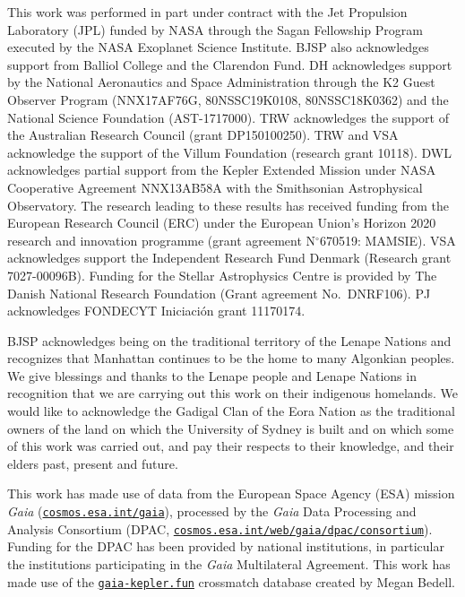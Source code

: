 \documentclass[modern]{aastex62}
\begin{document}
This work was performed in part under contract with the Jet Propulsion Laboratory (JPL) funded by NASA through the Sagan Fellowship Program executed by the NASA Exoplanet Science Institute. BJSP also acknowledges support from Balliol College and the Clarendon Fund. DH acknowledges support by the National Aeronautics and Space Administration through the K2 Guest Observer Program (NNX17AF76G, 80NSSC19K0108, 80NSSC18K0362) and the National Science Foundation (AST-1717000). TRW acknowledges the support of the Australian Research Council (grant DP150100250). TRW and VSA acknowledge
the support of the Villum Foundation (research grant 10118). DWL acknowledges partial support from the Kepler Extended Mission under NASA Cooperative Agreement NNX13AB58A with the Smithsonian Astrophysical Observatory. The research leading to these results has received funding from the European Research Council (ERC) under the European Union's Horizon 2020 research and innovation programme (grant agreement N$^\circ$670519: MAMSIE). VSA acknowledges support the Independent Research Fund Denmark (Research grant 7027-00096B). Funding for the Stellar Astrophysics Centre is provided by The Danish National Research Foundation (Grant agreement No.~DNRF106). PJ acknowledges FONDECYT Iniciaci\'on grant 11170174. 

BJSP acknowledges being on the traditional territory of the Lenape Nations and recognizes that Manhattan continues to be the home to many Algonkian peoples. We give blessings and thanks to the Lenape people and Lenape Nations in recognition that we are carrying out this work on their indigenous homelands. We would like to acknowledge the Gadigal Clan of the Eora Nation as the traditional owners of the land on which the University of Sydney is built and on which some of this work was carried out, and pay their respects to their knowledge, and their elders past, present and future. %

This work has made use of data from the European Space Agency (ESA) mission
{\it Gaia} (\href{https://www.cosmos.esa.int/gaia}{\nolinkurl{cosmos.esa.int/gaia}}), processed by the {\it Gaia}
Data Processing and Analysis Consortium (DPAC, \href{https://www.cosmos.esa.int/web/gaia/dpac/consortium}{\nolinkurl{cosmos.esa.int/web/gaia/dpac/consortium}}). Funding for the DPAC
has been provided by national institutions, in particular the institutions
participating in the {\it Gaia} Multilateral Agreement. This work has made use of the \href{https://gaia-kepler.fun}{\nolinkurl{gaia-kepler.fun}} crossmatch database created by Megan Bedell.
\end{document}
